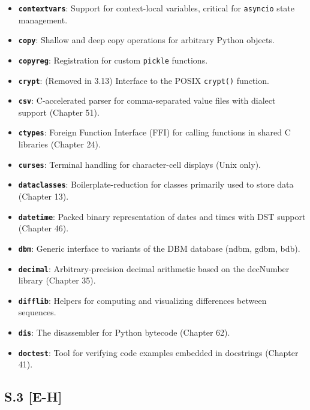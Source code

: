 \begin{itemize}
  65).
\item
  \textbf{\passthrough{\lstinline!contextvars!}}: Support for
  context-local variables, critical for
  \passthrough{\lstinline!asyncio!} state management.
\item
  \textbf{\passthrough{\lstinline!copy!}}: Shallow and deep copy
  operations for arbitrary Python objects.
\item
  \textbf{\passthrough{\lstinline!copyreg!}}: Registration for custom
  \passthrough{\lstinline!pickle!} functions.
\item
  \textbf{\passthrough{\lstinline!crypt!}}: (Removed in 3.13) Interface
  to the POSIX \passthrough{\lstinline!crypt()!} function.
\item
  \textbf{\passthrough{\lstinline!csv!}}: C-accelerated parser for
  comma-separated value files with dialect support (Chapter 51).
\item
  \textbf{\passthrough{\lstinline!ctypes!}}: Foreign Function Interface
  (FFI) for calling functions in shared C libraries (Chapter 24).
\item
  \textbf{\passthrough{\lstinline!curses!}}: Terminal handling for
  character-cell displays (Unix only).
\item
  \textbf{\passthrough{\lstinline!dataclasses!}}: Boilerplate-reduction
  for classes primarily used to store data (Chapter 13).
\item
  \textbf{\passthrough{\lstinline!datetime!}}: Packed binary
  representation of dates and times with DST support (Chapter 46).
\item
  \textbf{\passthrough{\lstinline!dbm!}}: Generic interface to variants
  of the DBM database (ndbm, gdbm, bdb).
\item
  \textbf{\passthrough{\lstinline!decimal!}}: Arbitrary-precision
  decimal arithmetic based on the decNumber library (Chapter 35).
\item
  \textbf{\passthrough{\lstinline!difflib!}}: Helpers for computing and
  visualizing differences between sequences.
\item
  \textbf{\passthrough{\lstinline!dis!}}: The disassembler for Python
  bytecode (Chapter 62).
\item
  \textbf{\passthrough{\lstinline!doctest!}}: Tool for verifying code
  examples embedded in docstrings (Chapter 41).
\end{itemize}

\hypertarget{s.3-e-h}{%
\subsection{S.3 {[}E-H{]}}\label{s.3-e-h}}

